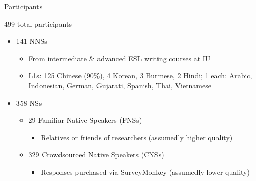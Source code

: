 \documentclass[final,t]{beamer}
\begin{document}
\begin{frame}{}
\begin{columns}[t]
\begin{column}{.33\linewidth}
\begin{block}{Participants}

\begin{center}
\begin{minipage}{.85\textwidth}
\begin{center}
499 total participants
\end{center}
	\begin{itemize}
		\item 141 NNSs
		\begin{itemize}
			\item From intermediate \& advanced ESL writing courses at IU
			\item L1s: 125 Chinese (90\%), 4 Korean, 3 Burmese, 2 Hindi; 1 each: Arabic, Indonesian, German, Gujarati, Spanish, Thai, Vietnamese
		\end{itemize}
		\item 358 NSs
		\begin{itemize}
			\item 29 Familiar Native Speakers (FNSs)
			\begin{itemize}
				\item Relatives or friends of researchers (assumedly higher quality)
			\end{itemize}
			\item 329 Crowdsourced Native Speakers (CNSs)
			\begin{itemize}
				\item Responses purchased via SurveyMonkey (assumedly lower quality)
			\end{itemize}
		\end{itemize}
	\end{itemize}
\end{minipage}
\end{center}
\vspace{-.5em}
\end{block}
\end{column}


\end{columns}
\end{frame}
\end{document}
